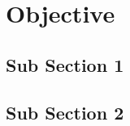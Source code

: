 \chapter{Objective}

    \lipsum[2-3]

    \section{Sub Section 1}
    \lipsum[2-4]
    
    \section{Sub Section 2}

    \lipsum[2]